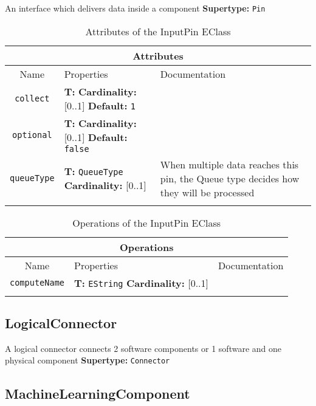 \documentclass{article}
\begin{document}
An interface which delivers data inside a component
\textbf{Supertype: }\texttt{Pin}
\begin{table}[H]
\footnotesize
\begin{tabularx}{\textwidth}{|c| p{4 cm} | X |}
\hline
\multicolumn{3}{|c|}{\textbf{Attributes}} \\
\hline
Name & Properties & Documentation \\ \hline \hline
\texttt{collect}
 & 
\textbf{T:} \texttt{}
\newline
\textbf{Cardinality:} [0..1]
\newline
\textbf{Default:} \texttt{1}
 & \\ \hline
\texttt{optional}
 & 
\textbf{T:} \texttt{}
\newline
\textbf{Cardinality:} [0..1]
\newline
\textbf{Default:} \texttt{false}
 & \\ \hline
\texttt{queueType}
 & 
\textbf{T:} \texttt{QueueType}
\newline
\textbf{Cardinality:} [0..1]
 & When multiple data reaches this pin, the Queue type decides how they will be processed\\ \hline
\caption{Attributes of the InputPin EClass}
\end{tabularx}
\label{e4smInputPinattr}
\end{table}
\begin{table}[H]
\footnotesize
\begin{tabularx}{\textwidth}{|c| p{4 cm} | X |}
\hline
\multicolumn{3}{|c|}{\textbf{Operations}} \\
\hline
Name & Properties & Documentation \\ \hline \hline
\texttt{computeName}
 & 
\textbf{T:} \texttt{EString}
\newline
\textbf{Cardinality:} [0..1]
 & \\ \hline
\caption{Operations of the InputPin EClass}
\end{tabularx}
\label{e4smInputPinop}
\end{table}
\subsection[LogicalConnector]{LogicalConnector}
\label{e4smLogicalConnector}

A logical connector connects 2 software components or 1 software and one physical component
\textbf{Supertype: }\texttt{Connector}
\subsection[MachineLearningComponent]{MachineLearningComponent}
\label{e4smMachineLearningComponent}
\end{document}
